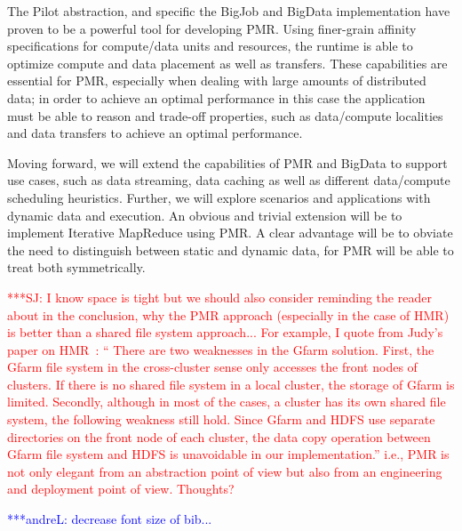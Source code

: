 \documentclass{acm_proc_article-sp}
\newcommand{\jhanote}[1]{ {\textcolor{red} { ***SJ: #1 }}}
\newcommand{\alnote}[1]{ {\textcolor{blue} { ***andreL: #1 }}}
\newcommand{\alnote}[1]{}
\newcommand{\jhanote}[1]{}
\newcommand{\upp}{\vspace*{-0.5em}}
\begin{document}

The Pilot abstraction, and specific the BigJob and BigData
implementation have proven to be a powerful tool for developing
PMR. Using finer-grain affinity specifications for compute/data units
and resources, the runtime is able to optimize compute and data
placement as well as transfers. These capabilities are essential for
PMR, especially when dealing with large amounts of distributed data;
in order to achieve an optimal performance in this case the
application must be able to reason and trade-off properties, such as
data/compute localities and data transfers to achieve an optimal
performance.

Moving forward, we will extend the capabilities of PMR and BigData to
support use cases, such as data streaming, data caching as well as
different data/compute scheduling heuristics. Further, we will explore
scenarios and applications with dynamic data and execution. An obvious
and trivial extension will be to implement Iterative MapReduce using
PMR. A clear advantage will be to obviate the need to distinguish
between static and dynamic data, for PMR will be able to treat both
symmetrically.  \upp


\jhanote{I know space is tight but we should also consider reminding
  the reader about in the conclusion, why the PMR approach (especially
  in the case of HMR) is better than a shared file system approach...
  For example, I quote from Judy's paper on HMR~\cite{ecmls11-mr-autodock}: `` There are two
  weaknesses in the Gfarm solution. First, the Gfarm file system in
  the cross-cluster sense only accesses the front nodes of
  clusters. If there is no shared file system in a local cluster, the
  storage of Gfarm is limited. Secondly, although in most of the
  cases, a cluster has its own shared file system, the following
  weakness still hold. Since Gfarm and HDFS use separate directories
  on the front node of each cluster, the data copy operation between
  Gfarm file system and HDFS is unavoidable in our implementation.''
  i.e., PMR is not only elegant from an abstraction point of view but
  also from an engineering and deployment point of view. Thoughts?}


\alnote{decrease font size of bib...}


%
%
%
\end{document}
